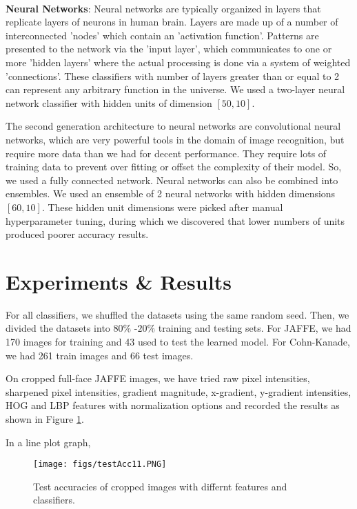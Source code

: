 \documentclass[10pt,twocolumn,letterpaper]{article}
\begin{document}
\paragraph{}
\textbf{Neural Networks}: Neural networks are typically organized in layers that replicate layers of neurons in human brain. Layers are made up of a number of interconnected 'nodes' which contain an 'activation function'. Patterns are presented to the network via the 'input layer', which communicates to one or more 'hidden layers' where the actual processing is done via a system of weighted 'connections'. These classifiers with number of layers greater than or equal to 2 can represent any arbitrary function in the universe. We used a two-layer neural network classifier with hidden units of dimension $[50, 10]$.

The second generation architecture to neural networks are convolutional neural networks, which are very powerful tools in the domain of image recognition, but require more data than we had for decent performance. They require lots of training data to prevent over fitting or offset the complexity of their model. So, we used a fully connected network. Neural networks can also be combined into ensembles. We used an ensemble of 2 neural networks with hidden dimensions $[60,10]$. These hidden unit dimensions were picked after manual hyperparameter tuning, during which we discovered that lower numbers of units produced poorer accuracy results.

\section{Experiments \& Results} 
For all classifiers, we shuffled the datasets using the same random seed. Then, we divided the datasets into $80\%$ -$20\%$ training and testing sets. For JAFFE, we had 170 images for training and 43 used to test the learned model. For Cohn-Kanade, we had 261 train images and 66 test images.

On cropped full-face JAFFE images, we have tried raw pixel intensities, sharpened pixel intensities, gradient magnitude, x-gradient, y-gradient intensities, HOG and LBP features with normalization options and recorded the results as shown in Figure \ref{fig:testacc1}. 

In a line plot graph,
\begin{figure}[h]
\texttt{[image: figs/testAcc11.PNG]}
\caption{Test accuracies of cropped images with differnt features and classifiers.}
\label{fig:testacc1}
\end{figure}
\end{document}
